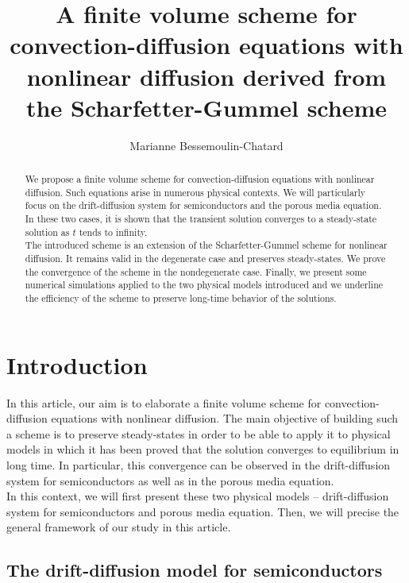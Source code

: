 \documentclass[smallextended]{svjour3}
\title{A finite volume scheme for convection-diffusion equations with nonlinear diffusion derived from the Scharfetter-Gummel scheme}
\author{Marianne Bessemoulin-Chatard}
\institute{Marianne Bessemoulin-Chatard \at Université Blaise Pascal - Laboratoire de Mathématiques UMR 6620 - CNRS - Campus des Cézeaux, B.P. 80026 63177 Aubière cedex \\ \email{Marianne.Chatard@math.univ-bpclermont.fr}}
\begin{document}
\maketitle

\begin{abstract}
We propose a finite volume scheme for convection-diffusion equations with nonlinear diffusion. Such equations arise in numerous physical contexts. We will particularly focus on the drift-diffusion system for semiconductors and the porous media equation. In these two cases, it is shown that the transient solution converges to a steady-state solution as $t$ tends to infinity. \\
The introduced scheme is an extension of the Scharfetter-Gummel scheme for nonlinear diffusion. It remains valid in the degenerate case and preserves steady-states. We prove the convergence of the scheme in the nondegenerate case. Finally, we present some numerical simulations applied to the two physical models introduced and we underline the efficiency of the scheme to preserve long-time behavior of the solutions.
\end{abstract}


\section{Introduction} 

In this article, our aim is to elaborate a finite volume scheme for convection-diffusion equations with nonlinear diffusion. The main objective of building such a scheme is to preserve steady-states in order to be able to apply it to physical models in which it has been proved that the solution converges to equilibrium in long time. In particular, this convergence can be observed in the drift-diffusion system for semiconductors as well as in the porous media equation. \\
In this context, we will first present these two physical models – drift-diffusion system for semiconductors and porous media equation. Then, we will precise the general framework of our study in this article.


\subsection{The drift-diffusion model for semiconductors}
\end{document}
